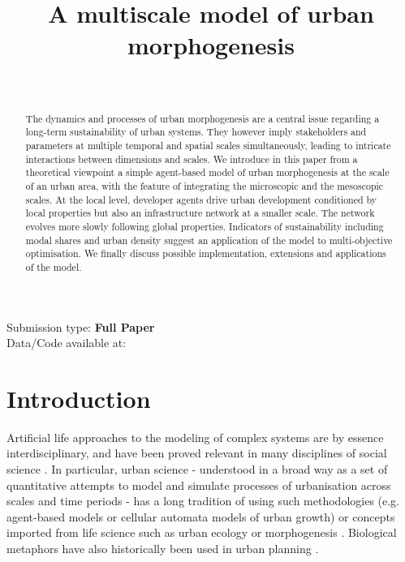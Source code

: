 \documentclass[letterpaper]{article}
\title{A multiscale model of urban morphogenesis}
\author{%
\mbox{}\\
}
\begin{document}
\maketitle

\begin{abstract}
The dynamics and processes of urban morphogenesis are a central issue regarding a long-term sustainability of urban systems. They however imply stakeholders and parameters at multiple temporal and spatial scales simultaneously, leading to intricate interactions between dimensions and scales. We introduce in this paper from a theoretical viewpoint a simple agent-based model of urban morphogenesis at the scale of an urban area, with the feature of integrating the microscopic and the mesoscopic scales. At the local level, developer agents drive urban development conditioned by local properties but also an infrastructure network at a smaller scale. The network evolves more slowly following global properties. Indicators of sustainability including modal shares and urban density suggest an application of the model to multi-objective optimisation. We finally discuss possible implementation, extensions and applications of the model.
\end{abstract}

Submission type: \textbf{Full Paper}\\

Data/Code available at: \url{}



\section{Introduction}

Artificial life approaches to the modeling of complex systems are by essence interdisciplinary, and have been proved relevant in many disciplines of social science \citep{youn2018scaling}. In particular, urban science - understood in a broad way as a set of quantitative attempts to model and simulate processes of urbanisation across scales and time periods \citep{batty2013new} - has a long tradition of using such methodologies (e.g. agent-based models or cellular automata models of urban growth) or concepts imported from life science such as urban ecology or morphogenesis \citep{raimbault2020cities}. Biological metaphors have also historically been used in urban planning \citep{batty2009centenary}.
\end{document}
